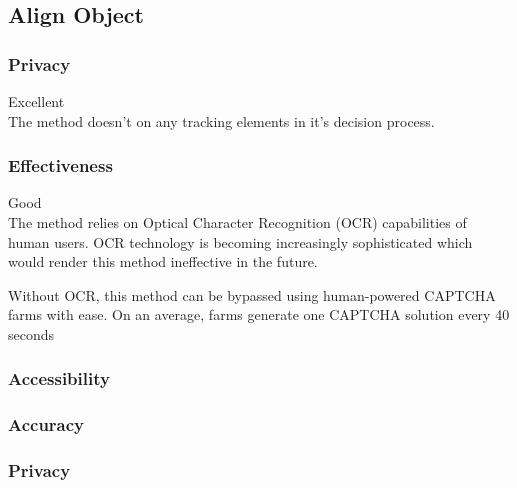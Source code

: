 \subsection{Align Object}
\subsubsection{Privacy}
Excellent\\
The method doesn't on any tracking elements in it's decision process.

\subsubsection{Effectiveness}
Good\\
The method relies on Optical Character Recognition (OCR) capabilities of human
users. OCR technology is becoming increasingly sophisticated which would render
this method ineffective in the future.

Without OCR, this method can be bypassed using human-powered CAPTCHA farms with
ease. On an average, farms generate one CAPTCHA solution every 40 seconds
\subsubsection{Accessibility}
\subsubsection{Accuracy}
\subsubsection{Privacy}
